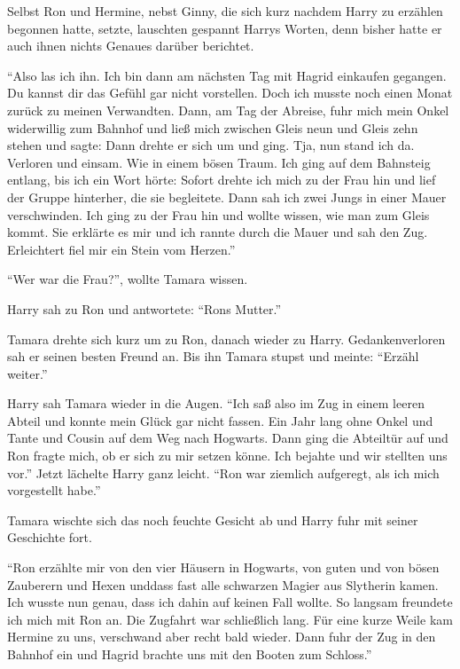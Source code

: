Selbst Ron und Hermine, nebst Ginny, die sich kurz nachdem Harry zu erzählen begonnen hatte, setzte, lauschten gespannt Harrys Worten, denn bisher hatte er auch ihnen nichts Genaues darüber berichtet.

\enquote{Also las ich ihn. Ich bin dann am nächsten Tag mit Hagrid einkaufen gegangen. Du kannst dir das Gefühl gar nicht vorstellen. Doch ich musste noch einen Monat zurück zu meinen Verwandten. Dann, am Tag der Abreise, fuhr mich mein Onkel widerwillig zum Bahnhof und ließ mich zwischen Gleis neun und Gleis zehn stehen und sagte:  Dann drehte er sich um und ging. Tja, nun stand ich da. Verloren und einsam. Wie in einem bösen Traum. Ich ging auf dem Bahnsteig entlang, bis ich ein Wort hörte:  Sofort drehte ich mich zu der Frau hin und lief der Gruppe hinterher, die sie begleitete. Dann sah ich zwei Jungs in einer Mauer verschwinden. Ich ging zu der Frau hin und wollte wissen, wie man zum Gleis kommt. Sie erklärte es mir und ich rannte durch die Mauer und sah den Zug. Erleichtert fiel mir ein Stein vom Herzen.}

\enquote{Wer war die Frau?}, wollte Tamara wissen.

Harry sah zu Ron und antwortete: \enquote{Rons Mutter.}

Tamara drehte sich kurz um zu Ron, danach wieder zu Harry. Gedankenverloren sah er seinen besten Freund an. Bis ihn Tamara stupst und meinte: \enquote{Erzähl weiter.}

Harry sah Tamara wieder in die Augen. \enquote{Ich saß also im Zug in einem leeren Abteil und konnte mein Glück gar nicht fassen. Ein Jahr lang ohne Onkel und Tante und Cousin auf dem Weg nach Hogwarts. Dann ging die Abteiltür auf und Ron fragte mich, ob er sich zu mir setzen könne. Ich bejahte und wir stellten uns vor.} Jetzt lächelte Harry ganz leicht. \enquote{Ron war ziemlich aufgeregt, als ich mich vorgestellt habe.}

Tamara wischte sich das noch feuchte Gesicht ab und Harry fuhr mit seiner Geschichte fort.

\enquote{Ron erzählte mir von den vier Häusern in Hogwarts, von guten und von bösen Zauberern und Hexen und\abs dass fast alle schwarzen Magier aus Slytherin kamen. Ich wusste nun genau, dass ich dahin auf keinen Fall wollte. So langsam freundete ich mich mit Ron an. Die Zugfahrt war schließlich lang. Für eine kurze Weile kam Hermine zu uns, verschwand aber recht bald wieder. Dann fuhr der Zug in den Bahnhof ein und Hagrid brachte uns mit den Booten zum Schloss.}

